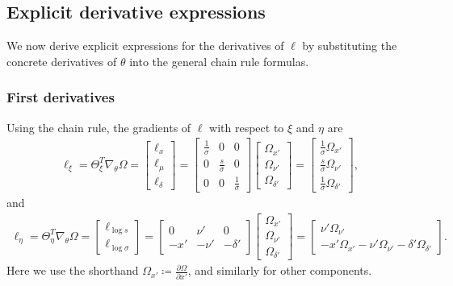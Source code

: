 \documentclass{article}
\begin{document}
\subsection{Explicit derivative expressions}\label{app:explicit-derivative-expressions}

We now derive explicit expressions for the derivatives of $\ell$ by substituting the concrete derivatives of $\theta$ into the general chain rule formulas.

\subsubsection{First derivatives}

Using the chain rule, the gradients of $\ell$ with respect to $\xi$ and $\eta$ are
%
\begin{align}
  \ell_\xi = \Theta_\xi^T \nabla_\theta \Omega =
  \begin{bmatrix} \ell_x \\ \ell_\mu \\ \ell_\delta \end{bmatrix}
  =
  \begin{bmatrix}
    \frac{1}{\sigma} & 0                & 0                \\
    0                & \frac{s}{\sigma} & 0                \\
    0                & 0                & \frac{1}{\sigma}
  \end{bmatrix}
  \begin{bmatrix} \Omega_{x'} \\ \Omega_{\nu'} \\ \Omega_{\delta'} \end{bmatrix}
  =
  \begin{bmatrix}
    \frac{1}{\sigma} \Omega_{x'}   \\
    \frac{s}{\sigma} \Omega_{\nu'} \\
    \frac{1}{\sigma} \Omega_{\delta'}
  \end{bmatrix},
\end{align}
%
and
%
\begin{align}
  \ell_\eta = \Theta_\eta^T \nabla_\theta \Omega =
  \begin{bmatrix} \ell_{\log s} \\ \ell_{\log \sigma} \end{bmatrix}
  =
  \begin{bmatrix}
    0   & \nu'  & 0        \\
    -x' & -\nu' & -\delta'
  \end{bmatrix}
  \begin{bmatrix} \Omega_{x'} \\ \Omega_{\nu'} \\ \Omega_{\delta'} \end{bmatrix}
  =
  \begin{bmatrix}
    \nu' \Omega_{\nu'} \\
    -x' \Omega_{x'} - \nu' \Omega_{\nu'} - \delta' \Omega_{\delta'}
  \end{bmatrix}.
\end{align}
%
Here we use the shorthand $\Omega_{x'} \coloneqq \frac{\partial \Omega}{\partial x'}$, and similarly for other components.
\end{document}
